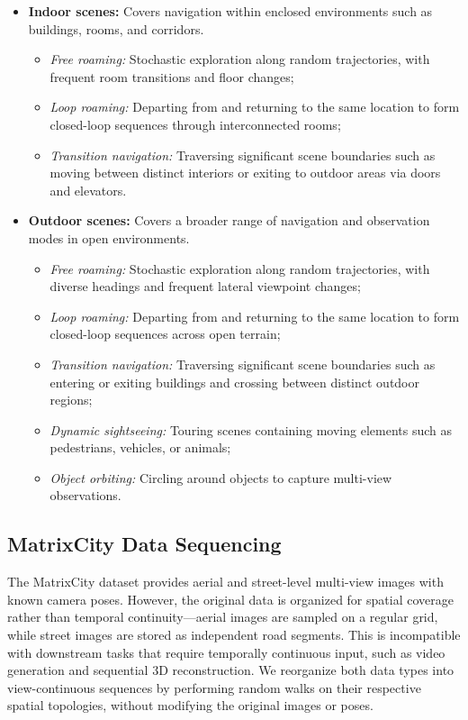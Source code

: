 \begin{itemize}
\item \textbf{Indoor scenes:} Covers navigation
  within enclosed environments such as buildings, rooms, and corridors.
  \begin{itemize}
  \item \textit{Free roaming:} Stochastic exploration along random
    trajectories, with frequent room transitions and floor changes;
  \item \textit{Loop roaming:} Departing from and returning to the same
    location to form closed-loop sequences through interconnected rooms;
  \item \textit{Transition navigation:} Traversing significant scene
    boundaries such as moving between distinct interiors or exiting to
    outdoor areas via doors and elevators.
  \end{itemize}

\item \textbf{Outdoor scenes:} Covers a broader
  range of navigation and observation modes in open environments.
  \begin{itemize}
  \item \textit{Free roaming:} Stochastic exploration along random
    trajectories, with diverse headings and frequent lateral viewpoint
    changes;
  \item \textit{Loop roaming:} Departing from and returning to the same
    location to form closed-loop sequences across open terrain;
  \item \textit{Transition navigation:} Traversing significant scene
    boundaries such as entering or exiting buildings and crossing between
    distinct outdoor regions;
  \item \textit{Dynamic sightseeing:} Touring scenes containing moving
    elements such as pedestrians, vehicles, or animals;
  \item \textit{Object orbiting:} Circling around objects to
    capture multi-view observations.
  \end{itemize}
\end{itemize}

\subsection{MatrixCity Data Sequencing}
\label{sec:matrixcity_data}

The MatrixCity dataset provides aerial and street-level multi-view images with known camera poses. However, the original data is organized for spatial coverage rather than temporal continuity---aerial images are sampled on a regular grid, while street images are stored as independent road segments. This is incompatible with downstream tasks that require temporally continuous input, such as video generation and sequential 3D reconstruction. We reorganize both data types into view-continuous sequences by performing random walks on their respective spatial topologies, without modifying the original images or poses.

